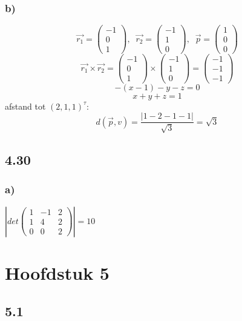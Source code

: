 \documentclass[11pt]{article}
\begin{document}
\subsubsection*{b)}
\[
\vec{r_1} = 
\begin{pmatrix}
-1\\0\\1
\end{pmatrix}
,\;\;
\vec{r_2} = 
\begin{pmatrix}
-1\\1\\0
\end{pmatrix}
,\;\;
\vec{p} = 
\begin{pmatrix}
1\\0\\0
\end{pmatrix}
\]
\[
\vec{r_1}\times\vec{r_2}=
\begin{pmatrix}
-1\\0\\1
\end{pmatrix}
\times
\begin{pmatrix}
-1\\1\\0
\end{pmatrix}
=
\begin{pmatrix}
-1\\-1\\-1
\end{pmatrix}
\]
\[-(x-1)-y-z=0\]
\[x+y+z=1\]
afstand tot $(2,1,1)^\tau$:\\
\[
d(\vec{p},v) = \frac{|1-2-1-1|}{\sqrt{3}} = \sqrt{3}
\]

\subsection*{4.30}
\subsubsection*{a)}
$\left\vert det\begin{pmatrix}
1 & -1 & 2 \\
1 & 4 & 2 \\
0 & 0 & 2
\end{pmatrix} \right\vert
= 10$

\section*{Hoofdstuk 5}
\subsection*{5.1}
\end{document}
